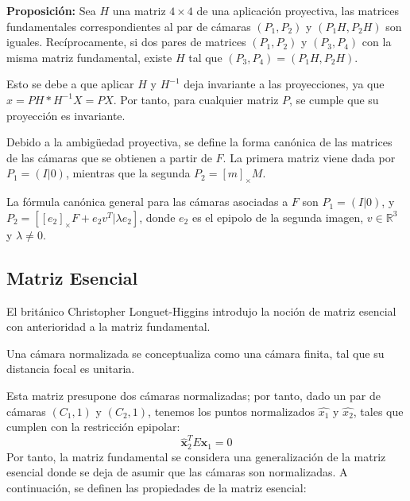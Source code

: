 \documentclass[
10pt, %
a4paper, %
oneside, %
headinclude,footinclude, %
BCOR=5mm, %
]{scrartcl}
\begin{document}
\textbf{Proposición:} Sea $H$ una matriz $4 \times 4$ de una aplicación proyectiva, las matrices fundamentales correspondientes al par de cámaras $(P_1,P_2)$ y $(P_1H,P_2H)$ son iguales. Recíprocamente, si dos pares de matrices $(P_1,P_2)$ y $(P_3,P_4)$ con la misma matriz fundamental, existe $H$ tal que $(P_3,P_4)=(P_1H,P_2H)$.

Esto se debe a que aplicar $H$ y $H^{-1}$ deja invariante a las proyecciones, ya que $x=PH*H^{-1}X=PX$. Por tanto, para cualquier matriz $P$, se cumple que su proyección es invariante. 

Debido a la ambigüedad proyectiva, se define la forma canónica de las matrices de las cámaras que se obtienen a partir de $F$. La primera matriz viene dada por $P_1=(I|0)$, mientras que la segunda $P_2=[m]_\times M$.

La fórmula canónica general para las cámaras asociadas a $F$ son $P_1=(I|0)$,  y $P_2=[[e_2]_\times F + e_2v^T|\lambda e_2]$, donde $e_2$ es el epipolo de la segunda imagen, $v \in \mathbb{R}^3$ y $\lambda \ne 0$.


\subsection{Matriz Esencial}
El británico Christopher Longuet-Higgins introdujo la noción de matriz esencial con anterioridad a la matriz fundamental. 
\begin{definition}
Una cámara normalizada se conceptualiza como una cámara finita, tal que su distancia focal es unitaria.
\end{definition}
Esta matriz presupone dos cámaras normalizadas; por tanto, dado un par de cámaras $(C_1,1)$ y $(C_2,1)$, tenemos los puntos normalizados $\hat{x_1}$ y $\hat{x_2}$, tales que cumplen con la restricción epipolar: 
\begin{equation}
    \mathbf{\hat{x}}_2^{T} E \mathbf{\hat{x}}_1 = 0
\end{equation}
Por tanto, la matriz fundamental se considera una generalización de la matriz esencial donde se deja de asumir que las cámaras son normalizadas.  A continuación, se definen las propiedades de la matriz esencial:
\end{document}
